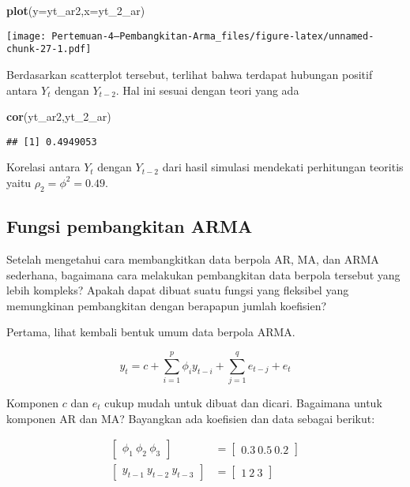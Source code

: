 \documentclass[
]{article}
\newenvironment{Shaded}{\begin{snugshade}}{\end{snugshade}}
\newcommand{\AttributeTok}[1]{\textcolor[rgb]{0.13,0.29,0.53}{#1}}
\newcommand{\FunctionTok}[1]{\textcolor[rgb]{0.13,0.29,0.53}{\textbf{#1}}}
\newcommand{\NormalTok}[1]{#1}
\begin{document}
\begin{Shaded}
\begin{Highlighting}[]
\FunctionTok{plot}\NormalTok{(}\AttributeTok{y=}\NormalTok{yt\_ar2,}\AttributeTok{x=}\NormalTok{yt\_2\_ar)}
\end{Highlighting}
\end{Shaded}

\texttt{[image: Pertemuan-4---Pembangkitan-Arma\_files/figure-latex/unnamed-chunk-27-1.pdf]}

Berdasarkan scatterplot tersebut, terlihat bahwa terdapat hubungan
positif antara \(Y_t\) dengan \(Y_{t-2}\). Hal ini sesuai dengan teori
yang ada

\begin{Shaded}
\begin{Highlighting}[]
\FunctionTok{cor}\NormalTok{(yt\_ar2,yt\_2\_ar)}
\end{Highlighting}
\end{Shaded}

\begin{verbatim}
## [1] 0.4949053
\end{verbatim}

Korelasi antara \(Y_t\) dengan \(Y_{t-2}\) dari hasil simulasi mendekati
perhitungan teoritis yaitu \(\rho_2=\phi^2=0.49\).

\subsection{Fungsi pembangkitan ARMA}\label{fungsi-pembangkitan-arma}

Setelah mengetahui cara membangkitkan data berpola AR, MA, dan ARMA
sederhana, bagaimana cara melakukan pembangkitan data berpola tersebut
yang lebih kompleks? Apakah dapat dibuat suatu fungsi yang fleksibel
yang memungkinan pembangkitan dengan berapapun jumlah koefisien?

Pertama, lihat kembali bentuk umum data berpola ARMA.

\[
y_{t} = c + \sum_{i=1}^p \phi_{i}y_{t-i} + \sum_{j=1}^q e_{t-j}+ e_{t}
\]

Komponen \(c\) dan \(e_{t}\) cukup mudah untuk dibuat dan dicari.
Bagaimana untuk komponen AR dan MA? Bayangkan ada koefisien dan data
sebagai berikut:

\[
\begin{aligned}
\begin{bmatrix}
\phi_1 \  \phi_2 \ \phi_3
\end{bmatrix}&=
\begin{bmatrix}
0.3 \ 0.5 \ 0.2
\end{bmatrix}
\\
\begin{bmatrix}
y_{t-1} \  y_{t-2} \ y_{t-3}
\end{bmatrix}&=
\begin{bmatrix}
1 \ 2 \ 3
\end{bmatrix}
\end{aligned}
\]
\end{document}

